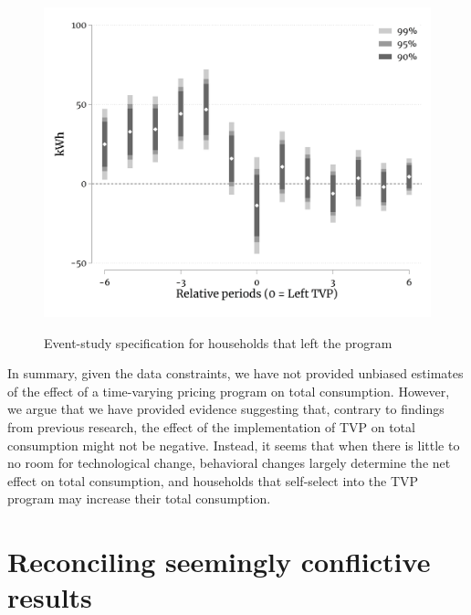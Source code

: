 \documentclass[12pt]{article}
\begin{document}
\begin{figure}[ht]
  \caption{Event-study specification for households that left the program}\label{fig:three}
  \begin{center}
  {\includegraphics[width=1\textwidth]{./figures/eventStudyType3_6months.png}}
  \end{center}
\end{figure}

In summary, given the data constraints, we have not provided unbiased estimates of the effect of a time-varying pricing program on total consumption. However, we argue that we have provided evidence suggesting that, contrary to findings from previous research, the effect of the implementation of TVP on total consumption might not be negative. Instead, it seems that when there is little to no room for technological change, behavioral changes largely determine the net effect on total consumption, and households that self-select into the TVP program may increase their total consumption.

\section{Reconciling seemingly conflictive results}
\end{document}
